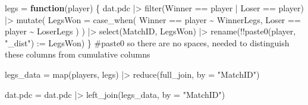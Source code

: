 \documentclass[
]{article}
\newenvironment{Shaded}{\begin{snugshade}}{\end{snugshade}}
\newcommand{\AttributeTok}[1]{\textcolor[rgb]{0.40,0.45,0.13}{#1}}
\newcommand{\CommentTok}[1]{\textcolor[rgb]{0.37,0.37,0.37}{#1}}
\newcommand{\ControlFlowTok}[1]{\textcolor[rgb]{0.00,0.23,0.31}{\textbf{#1}}}
\newcommand{\ErrorTok}[1]{\textcolor[rgb]{0.68,0.00,0.00}{#1}}
\newcommand{\FunctionTok}[1]{\textcolor[rgb]{0.28,0.35,0.67}{#1}}
\newcommand{\NormalTok}[1]{\textcolor[rgb]{0.00,0.23,0.31}{#1}}
\newcommand{\OtherTok}[1]{\textcolor[rgb]{0.00,0.23,0.31}{#1}}
\newcommand{\SpecialCharTok}[1]{\textcolor[rgb]{0.37,0.37,0.37}{#1}}
\newcommand{\StringTok}[1]{\textcolor[rgb]{0.13,0.47,0.30}{#1}}
\begin{document}
\begin{Shaded}
\begin{Highlighting}[numbers=left,,]
\NormalTok{legs }\OtherTok{=} \ControlFlowTok{function}\NormalTok{(player) \{}
\NormalTok{  dat.pdc }\SpecialCharTok{|\textgreater{}}
    \FunctionTok{filter}\NormalTok{(Winner }\SpecialCharTok{==}\NormalTok{ player }\SpecialCharTok{|}\NormalTok{ Loser }\SpecialCharTok{==}\NormalTok{ player) }\SpecialCharTok{|\textgreater{}}
    \FunctionTok{mutate}\NormalTok{(}
      \AttributeTok{LegsWon =} \FunctionTok{case\_when}\NormalTok{(}
\NormalTok{        Winner }\SpecialCharTok{==}\NormalTok{ player }\SpecialCharTok{\textasciitilde{}}\NormalTok{ WinnerLegs,}
\NormalTok{        Loser  }\SpecialCharTok{==}\NormalTok{ player }\SpecialCharTok{\textasciitilde{}}\NormalTok{ LoserLegs}
\NormalTok{      )}
\NormalTok{    ) }\SpecialCharTok{|\textgreater{}}
    \FunctionTok{select}\NormalTok{(MatchID, LegsWon) }\SpecialCharTok{|\textgreater{}}
    \FunctionTok{rename}\NormalTok{(}\SpecialCharTok{!!}\FunctionTok{paste0}\NormalTok{(player, }\StringTok{"\_dist"}\NormalTok{) }\SpecialCharTok{:}\ErrorTok{=}\NormalTok{ LegsWon)}
\NormalTok{\}}
 \CommentTok{\#paste0 so there are no spaces, needed to distinguish these columns from cumulative columns}

\NormalTok{legs\_data }\OtherTok{=} \FunctionTok{map}\NormalTok{(players, legs) }\SpecialCharTok{|\textgreater{}} \FunctionTok{reduce}\NormalTok{(full\_join, }\AttributeTok{by =} \StringTok{"MatchID"}\NormalTok{)}

\NormalTok{dat.pdc }\OtherTok{=}\NormalTok{ dat.pdc }\SpecialCharTok{|\textgreater{}} \FunctionTok{left\_join}\NormalTok{(legs\_data, }\AttributeTok{by =} \StringTok{"MatchID"}\NormalTok{)}
\end{Highlighting}
\end{Shaded}

\normalsize

\normalsize
\end{document}
